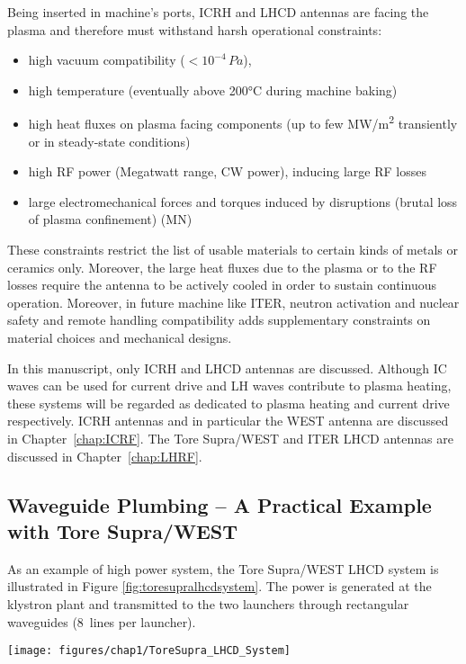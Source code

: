 Being inserted in machine's ports, ICRH and LHCD antennas are facing the plasma and therefore must  withstand harsh operational constraints: 
\begin{itemize}
	\item high vacuum compatibility ($<10^{-4}\,\si{Pa}$), 
	\item high temperature (eventually above 200°C during machine baking)
	\item high heat fluxes on plasma facing components (up to few \si{MW/m^2} transiently or in steady-state conditions)
	\item high RF power (Megatwatt range, CW power), inducing large RF losses
	\item large electromechanical forces and torques induced by disruptions (brutal loss of plasma confinement) (\si{MN})
\end{itemize}
These constraints restrict the list of usable materials to certain kinds of metals or ceramics only. Moreover, the large heat fluxes due to the plasma or to the RF losses require the antenna to be actively cooled in order to sustain continuous operation. Moreover, in future machine like ITER, neutron activation and nuclear safety and remote handling compatibility adds supplementary constraints on material choices and mechanical designs.

In this manuscript, only ICRH and LHCD antennas are discussed. Although IC waves can be used for current drive and LH waves contribute to plasma heating, these systems will be regarded as dedicated to plasma heating and current drive respectively. ICRH antennas and in particular the WEST antenna are discussed in Chapter~\ref{chap:ICRF}. The Tore Supra/WEST and ITER LHCD antennas are discussed in Chapter~\ref{chap:LHRF}.


\subsection{Waveguide Plumbing – A Practical Example with Tore Supra/WEST}
As an example of high power system, the Tore Supra/WEST LHCD system is illustrated in Figure \ref{fig:toresupralhcdsystem}. The power is generated at the klystron plant and transmitted to the two launchers through rectangular waveguides (8~lines per launcher). 

\begin{figure*}
	\centering
	\texttt{[image: figures/chap1/ToreSupra\_LHCD\_System]}
	\caption{Schematic of the Tore Supra LHCD system, from the klystrons plant to the vacuum vessel.}
	\label{fig:toresupralhcdsystem}
\end{figure*}

